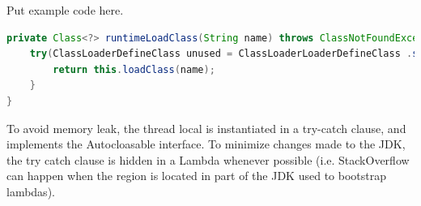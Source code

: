 Put example code here.
\begin{lstlisting}[language=Java]
private Class<?> runtimeLoadClass(String name) throws ClassNotFoundException {
    try(ClassLoaderDefineClass unused = ClassLoaderLoaderDefineClass .setIsRuntimeDefineClassAllowed()) {
        return this.loadClass(name);
    }
}
\end{lstlisting}
To avoid memory leak, the thread local is instantiated in a try-catch clause, and implements the Autocloasable interface.
To minimize changes made to the JDK, the try catch clause is hidden in a Lambda whenever possible (i.e. StackOverflow can happen when the region is located in part of the JDK used to bootstrap lambdas).




